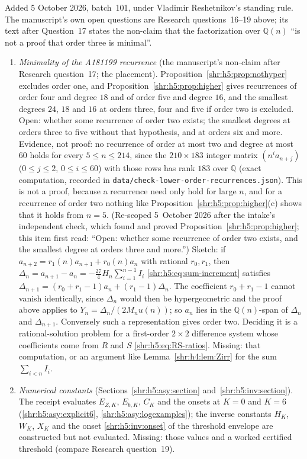 \documentclass[11pt,letterpaper]{article}
\numberwithin{equation}{section}
\theoremstyle{definition}
\newcommand{\Q}{\mathbb Q}
\newcommand{\1}{\mathbf 1}
\begin{document}
Added 5 October 2026, batch~101, under Vladimir Reshetnikov's standing rule.
The manuscript's own open questions are Research questions~16--19 above;
its text after Question~17 states the non-claim that the factorization
over $\Q(n)$ ``is not a proof that order three is minimal''.
\begin{enumerate}[label=(F\arabic*),leftmargin=*,start=9]
\item \emph{Minimality of the A181199 recurrence} (the manuscript's
non-claim after Research question~17; the placement). Proposition~\ref{shr:h5:prop:nothyper}
excludes order one, and Proposition~\ref{shr:h5:prop:higher} gives
recurrences of order four and degree $18$ and of order five and degree
$16$, and the smallest degrees $24$, $18$ and $16$ at orders three, four
and five if order two is excluded. Open: whether some recurrence of order
two exists; the smallest degrees at orders three to five without that
hypothesis, and at orders six and more. Evidence, not proof: no recurrence
of order at most two and degree at most $60$ holds for every
$5\le n\le214$, since the $210\times183$ integer matrix $(n^ia_{n+j})$
($0\le j\le2$, $0\le i\le60$) with those rows has rank $183$ over $\Q$
(exact computation, recorded in \texttt{data/\allowbreak check-\allowbreak lower-\allowbreak order-\allowbreak recurrences.\allowbreak json}). This is not a proof, because a
recurrence need only hold for large $n$, and for a recurrence of order two
nothing like Proposition~\ref{shr:h5:prop:higher}(c) shows that it holds
from $n=5$. (Re-scoped 5~October 2026 after the intake's independent
check, which found and proved Proposition~\ref{shr:h5:prop:higher}; this
item first read: ``Open: whether some recurrence of order two exists, and
the smallest degree at orders three and more.'') Sketch: if
$a_{n+2}=r_1(n)a_{n+1}+r_0(n)a_n$ with rational $r_0,r_1$, then
$\Delta_n=a_{n+1}-a_n=-\tfrac{27}4H_n\sum_{i=1}^{n-1}I_i$
\eqref{shr:h5:eq:sum-increment} satisfies
$\Delta_{n+1}=(r_0+r_1-1)a_n+(r_1-1)\Delta_n$. The coefficient
$r_0+r_1-1$ cannot vanish identically, since $\Delta_n$ would then be
hypergeometric and the proof above applies to $Y_n=\Delta_n/(2M_nu(n))$;
so $a_n$ lies in the $\Q(n)$-span of $\Delta_n$ and $\Delta_{n+1}$.
Conversely such a representation gives order two. Deciding it is a
rational-solution problem for a first-order $2\times2$ difference system
whose coefficients come from $R$ and $S$ \eqref{shr:h5:eq:RS-ratios}.
Missing: that computation, or an argument like
Lemma~\ref{shr:h4:lem:Zirr} for the sum $\sum_{i<n}I_i$.
\item \emph{Numerical constants} (Sections~\ref{shr:h5:asy:section}
and~\ref{shr:h5:inv:section}). The receipt evaluates $E_{Z,K}$, $E_{b,K}$,
$C_K$ and the onsets at $K=0$ and $K=6$
(\eqref{shr:h5:asy:explicit6}, \eqref{shr:h5:asy:logexamples}); the inverse
constants $H_K$, $W_K$, $X_K$ and the onset \eqref{shr:h5:inv:onset} of the
threshold envelope are constructed but not evaluated. Missing: those
values and a worked certified threshold (compare Research question~19).
\end{enumerate}
\end{document}
